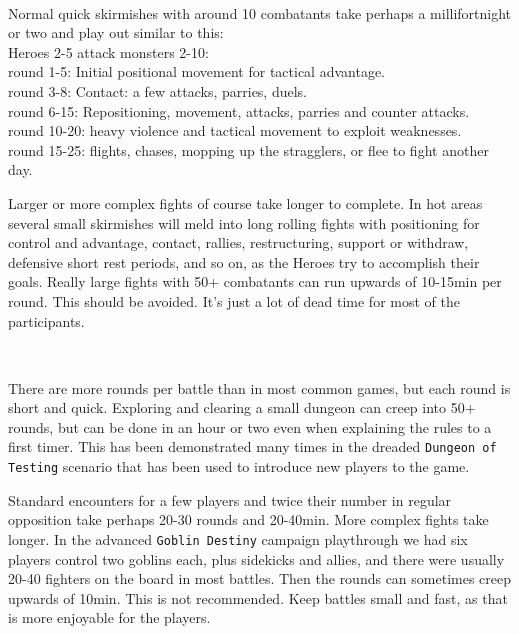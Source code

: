 \

Normal quick skirmishes with around 10 combatants take perhaps a millifortnight or two and play out similar to this: \\
Heroes 2-5 attack monsters 2-10: \\
round 1-5: Initial positional movement for tactical advantage. \\
round 3-8: Contact: a few attacks, parries, duels. \\
round 6-15: Repositioning, movement, attacks, parries and counter attacks. \\
round 10-20: heavy violence and tactical movement to exploit weaknesses. \\
round 15-25: flights, chases, mopping up the stragglers, or flee to fight another day.

Larger or more complex fights of course take longer to complete. In hot areas several small skirmishes will meld into long rolling fights with positioning for control and advantage, contact, rallies, restructuring, support or withdraw, defensive short rest periods, and so on, as the Heroes try to accomplish their goals.
Really large fights with 50+ combatants can run upwards of 10-15min per round. This should be avoided. It's just a lot of dead time for most of the participants.

\

There are more rounds per battle than in most common games, but each round is short and quick. Exploring and clearing a small dungeon can creep into 50+ rounds, but can be done in an hour or two even when explaining the rules to a first timer. This has been demonstrated many times in the dreaded \texttt{Dungeon of Testing} scenario that has been used to introduce new players to the game.

Standard encounters for a few players and twice their number in regular opposition take perhaps 20-30 rounds and 20-40min. More complex fights take longer. In the advanced \texttt{Goblin Destiny} campaign playthrough we had six players control two goblins each, plus sidekicks and allies, and there were usually 20-40 fighters on the board in most battles. Then the rounds can sometimes creep upwards of 10min. This is not recommended. Keep battles small and fast, as that is more enjoyable for the players.

